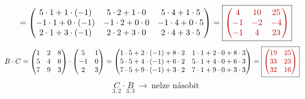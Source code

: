 \documentclass[11pt,a4paper]{article}
\newcommand{\vysl}[1]{\boxed{\color{red!75!black}#1}}
\begin{document}
\begin{fleqn}[0pt]
{\begin{align*}
= \begin{pmatrix} 5\cdot1+1\cdot(-1) & 5\cdot2+1\cdot0 & 5\cdot4+1\cdot5\\ -1\cdot1+0\cdot(-1) & -1\cdot2+0\cdot0 & -1\cdot4+0\cdot5\\ 2\cdot1+3\cdot(-1) & 2\cdot2+3\cdot0 & 2\cdot4+3\cdot5 \end{pmatrix} = \vysl{\begin{pmatrix} 4 & 10 & 25\\ -1 & -2 & -4\\ -1 & 4 & 23 \end{pmatrix}}
\end{align*}}
\begin{align*}
B\cdot C &= \begin{pmatrix} 1 & 2 & 8\\ 5 & 4 & 6\\ 7 & 9 & 3 \end{pmatrix}\cdot\begin{pmatrix} 5 & 1\\ -1 & 0\\ 2 & 3 \end{pmatrix}
= \begin{pmatrix} 1\cdot5+2\cdot(-1)+8\cdot2 & 1\cdot1+2\cdot0+8\cdot3\\ 5\cdot5+4\cdot(-1)+6\cdot2 & 5\cdot1+4\cdot0+6\cdot3\\ 7\cdot5+9\cdot(-1)+3\cdot2 & 7\cdot1+9\cdot0+3\cdot3 \end{pmatrix} = \vysl{\begin{pmatrix} 19 & 25\\ 33 & 23\\ 32 & 16 \end{pmatrix}}
\end{align*}
\[
\underset{3,2}{C}\cdot\underset{3,3}{B} \ \to\ \text{nelze násobit}
\]
\end{fleqn}
\end{document}
